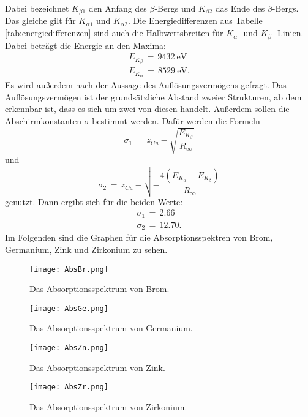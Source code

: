 \documentclass[
  bibliography=totoc,     %
  captions=tableheading,  %
  titlepage=firstiscover, %
]{scrartcl}
\begin{document}
\noindent
Dabei bezeichnet $K_{\beta 1}$ den Anfang des $\beta$-Bergs und $K_{\beta 2}$ das Ende des $\beta$-Bergs. Das gleiche gilt für $K_{\alpha 1}$ und $K_{\alpha 2}$. Die Energiedifferenzen aus Tabelle \ref{tab:energiedifferenzen} sind auch die Halbwertsbreiten für $K_{\alpha}$- und $K_{\beta}$- Linien. Dabei beträgt die Energie an den Maxima:
\begin{align*}
  E_{K_{\beta}}\,=\,\SI{9432}{\electronvolt} \\
  E_{K_{\alpha}}\,=\,\SI{8529}{\electronvolt}.
\end{align*}
Es wird außerdem nach der Aussage des Auflösungsvermögens gefragt. Das Auflösungsvermögen ist der grundsätzliche Abstand zweier Strukturen, ab dem erkennbar ist, dass es sich um zwei von diesen handelt. Außerdem sollen die Abschirmkonstanten $\sigma$ bestimmt werden. Dafür werden die Formeln
\begin{equation}
  \sigma_1\,=\,z_{Cu}-\sqrt{\frac{E_{K_{\beta}}}{R_{\infty}}}
\end{equation}
und
\begin{equation}
  \sigma_2\,=\,z_{Cu}-\sqrt{- \frac{4(E_{K_{\alpha}}-E_{K_{\beta}})}{R_{\infty}}}
\end{equation}
genutzt.
\noindent
Dann ergibt sich für die beiden Werte:
\begin{align*}
  \sigma_{1}\,=\,2.66 \\
  \sigma_{2}\,=\,12.70.
\end{align*}
Im Folgenden sind die Graphen für die Absorptionsspektren von Brom, Germanium, Zink und Zirkonium zu sehen.
\begin{figure}[H]
  \centering
  \texttt{[image: AbsBr.png]}
  \caption{Das Absorptionsspektrum von Brom.}
  \label{fig:6027}
\end{figure}
\begin{figure}[H]
  \centering
  \texttt{[image: AbsGe.png]}
  \caption{Das Absorptionsspektrum von Germanium.}
  \label{fig:6028}
\end{figure}
\begin{figure}[H]
  \centering
  \texttt{[image: AbsZn.png]}
  \caption{Das Absorptionsspektrum von Zink.}
  \label{fig:6029}
\end{figure}
\begin{figure}[H]
  \centering
  \texttt{[image: AbsZr.png]}
  \caption{Das Absorptionsspektrum von Zirkonium.}
  \label{fig:60210}
\end{figure}
\noindent
\end{document}
